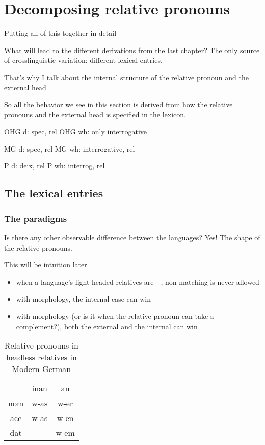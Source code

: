 
\chapter{Decomposing relative pronouns}\label{ch:decomposing-relative-pronouns}

Putting all of this together in detail

What will lead to the different derivations from the last chapter? The only source of crosslinguistic variation: different lexical entries.

That's why I talk about the internal structure of the relative pronoun and the external head

So all the behavior we see in this section is derived from how the relative pronouns and the external head is specified in the lexicon.

OHG d: spec, rel
OHG wh: only interrogative

MG d: spec, rel
MG wh: interrogative, rel

P d: deix, rel
P wh: interrog, rel


\section{The lexical entries}


\subsection{The paradigms}

Is there any other observable difference between the languages? Yes! The shape of the relative pronouns.

This will be intuition later

\begin{itemize}
  \item when a language's light-headed relatives are  - , non-matching is never allowed
  \item with  morphology, the internal case can win
  \item with  morphology (or is it when the relative pronoun can take a complement?), both the external and the internal can win
\end{itemize}


\begin{table}[H]
 \center
 \caption {Relative pronouns in headless relatives in Modern German}
  \begin{tabular}{ccc}
  \toprule
       & \ac{inan} & \ac{an} \\
        \cmidrule{2-3}
    \ac{nom}  & w-as     & w-er    \\
    \ac{acc}  & w-as     & w-en   \\
    \ac{dat}  & -      & w-em    \\
  \bottomrule
  \end{tabular}
\end{table}

